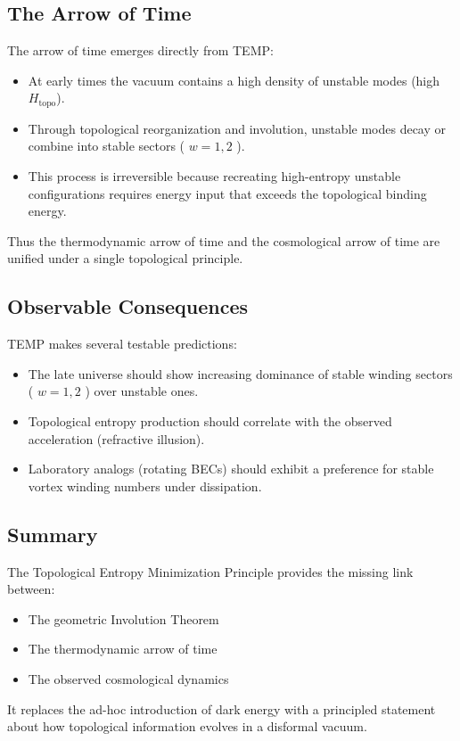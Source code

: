 \documentclass[11pt,a4paper]{article}
\begin{document}
\subsection{The Arrow of Time}
The arrow of time emerges directly from TEMP:
\begin{itemize}
\item At early times the vacuum contains a high density of unstable modes (high \(H_{\mathrm{topo}}\)).
\item Through topological reorganization and involution, unstable modes decay or combine into stable sectors ( \(w = 1,2\) ).
\item This process is irreversible because recreating high-entropy unstable configurations requires energy input that exceeds the topological binding energy.
\end{itemize}
Thus the thermodynamic arrow of time and the cosmological arrow of time are unified under a single topological principle.

\subsection{Observable Consequences}
TEMP makes several testable predictions:
\begin{itemize}
\item The late universe should show increasing dominance of stable winding sectors ( \(w = 1,2\) ) over unstable ones.
\item Topological entropy production should correlate with the observed acceleration (refractive illusion).
\item Laboratory analogs (rotating BECs) should exhibit a preference for stable vortex winding numbers under dissipation.
\end{itemize}

\subsection{Summary}
The Topological Entropy Minimization Principle provides the missing link between:
\begin{itemize}
\item The geometric Involution Theorem
\item The thermodynamic arrow of time
\item The observed cosmological dynamics
\end{itemize}
It replaces the ad-hoc introduction of dark energy with a principled statement about how topological information evolves in a disformal vacuum.
\end{document}
